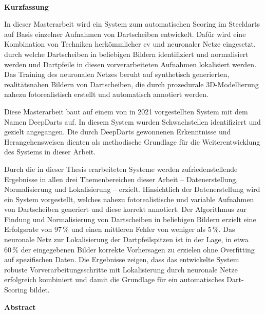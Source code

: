 
\mbox{~}
\newpage

\vspace*{2.17cm}

{\noindent\Huge\textbf{Kurzfassung}}

\vspace*{1.405cm}

\noindent In dieser Masterarbeit wird ein System zum automatischen Scoring im Steeldarts auf Basis einzelner Aufnahmen von Dartscheiben entwickelt. Dafür wird eine Kombination von Techniken herkömmlicher \ac{cv} und neuronaler Netze eingesetzt, durch welche Dartscheiben in beliebigen Bildern identifiziert und normalisiert werden und Dartpfeile in diesen vorverarbeiteten Aufnahmen lokalisiert werden. Das Training des neuronalen Netzes beruht auf synthetisch generierten, realitätsnahen Bildern von Dartscheiben, die durch prozedurale 3D-Modellierung nahezu fotorealistisch erstellt und automatisch annotiert werden.

Diese Masterarbeit baut auf einem von \citeauthor{deepdarts} in 2021 vorgestellten System mit dem Namen DeepDarts auf. In diesem System wurden Schwachstellen identifiziert und gezielt angegangen. Die durch DeepDarts gewonnenen Erkenntnisse und Herangehensweisen dienten als methodische Grundlage für die Weiterentwicklung des Systems in dieser Arbeit.

Durch die in dieser Thesis erarbeiteten Systeme werden zufriedenstellende Ergebnisse in allen drei Themenbereichen dieser Arbeit -- Datenerstellung, Normalisierung und Lokalisierung -- erzielt. Hinsichtlich der Datenerstellung wird ein System vorgestellt, welches nahezu fotorealistische und variable Aufnahmen von Dartscheiben generiert und diese korrekt annotiert. Der Algorithmus zur Findung und Normalisierung von Dartscheiben in beliebigen Bildern erzielt eine Erfolgsrate von $97\,\%$ und einen mittleren Fehler von weniger als $5\,\%$. Das neuronale Netz zur Lokalisierung der Dartpfeilspitzen ist in der Lage, in etwa $60\,\%$ der eingegebenen Bilder korrekte Vorhersagen zu erzielen ohne Overfitting auf spezifischen Daten. Die Ergebnisse zeigen, dass das entwickelte System robuste Vorverarbeitungsschritte mit Lokalisierung durch neuronale Netze erfolgreich kombiniert und damit die Grundlage für ein automatisches Dart-Scoring bildet.

\newpage

\vspace*{2.17cm}

{\noindent\Huge\textbf{Abstract}}

